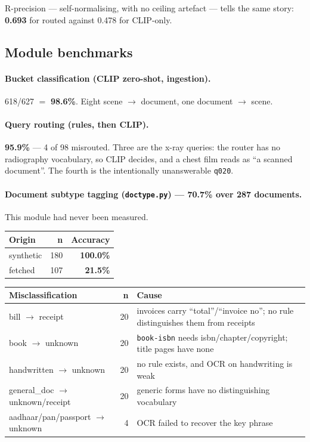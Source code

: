 \documentclass[11pt,a4paper]{article}
\newcommand{\code}[1]{\texttt{\small #1}}
\newcommand{\best}[1]{\textbf{#1}}
\begin{document}
R-precision --- self-normalising, with no ceiling artefact --- tells the same
story: \textbf{0.693} for routed against 0.478 for CLIP-only.

\subsection{Module benchmarks}
\label{sec:modules}

\paragraph{Bucket classification (CLIP zero-shot, ingestion).}
618/627 $=$ \textbf{98.6\%}. Eight scene $\rightarrow$ document, one
document $\rightarrow$ scene.

\paragraph{Query routing (rules, then CLIP).}
\textbf{95.9\%} --- 4 of 98 misrouted. Three are the x-ray queries: the router
has no radiography vocabulary, so CLIP decides, and a chest film reads as ``a
scanned document''. The fourth is the intentionally unanswerable \code{q020}.

\paragraph{Document subtype tagging (\code{doctype.py}) --- 70.7\% over 287
documents.} This module had never been measured.

\begin{center}
\begin{tabular}{@{}lrr@{}}
\toprule
\textbf{Origin} & \textbf{n} & \textbf{Accuracy} \\
\midrule
synthetic & 180 & \best{100.0\%} \\
fetched   & 107 & \best{21.5\%} \\
\bottomrule
\end{tabular}
\end{center}

\begin{center}
\begin{tabular}{@{}lrp{8.6cm}@{}}
\toprule
\textbf{Misclassification} & \textbf{n} & \textbf{Cause} \\
\midrule
bill $\rightarrow$ receipt & 20 & invoices carry ``total''/``invoice no''; no rule distinguishes them from receipts \\
book $\rightarrow$ unknown & 20 & \code{book-isbn} needs isbn/chapter/copyright; title pages have none \\
handwritten $\rightarrow$ unknown & 20 & no rule exists, and OCR on handwriting is weak \\
general\_doc $\rightarrow$ unknown/receipt & 20 & generic forms have no distinguishing vocabulary \\
aadhaar/pan/passport $\rightarrow$ unknown & 4 & OCR failed to recover the key phrase \\
\bottomrule
\end{tabular}
\end{center}
\end{document}
